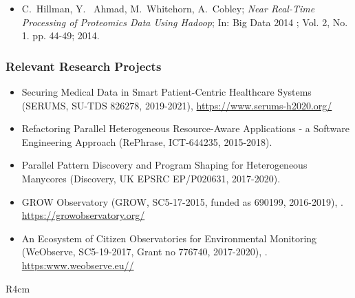 \documentclass[a4paper,11pt]{article}
\begin{document}
\begin{itemize}
\item C.~Hillman, Y.~ Ahmad, M.~Whitehorn, A.~Cobley; \emph{Near Real-Time Processing of Proteomics Data Using Hadoop}; In: Big Data 2014 ; Vol. 2, No. 1. pp. 44-49; 2014.

\end{itemize}
\subsubsection*{Relevant Research Projects}

\begin{itemize}
\item Securing Medical Data in Smart Patient-Centric Healthcare Systems (SERUMS, SU-TDS 826278, 2019-2021),  \url{https://www.serums-h2020.org/}

\item Refactoring Parallel Heterogeneous Resource-Aware Applications - a Software Engineering Approach (RePhrase, ICT-644235, 2015-2018).

\item Parallel Pattern Discovery and Program Shaping for Heterogeneous Manycores (Discovery, UK EPSRC EP/P020631, 2017-2020).

\item GROW Observatory (GROW, SC5-17-2015, funded as 690199, 2016-2019), . \url{https://growobservatory.org/}


\item An Ecosystem of Citizen Observatories for Environmental Monitoring (WeObserve, SC5-19-2017, Grant no 776740, 2017-2020), . \url{https:www.weobserve.eu//}
\end{itemize}

\begin{wrapfigure}{R}{4cm}
\vspace{-2.5cm}
\hfill {}
\vspace{-1cm}
\end{wrapfigure}
\end{document}
